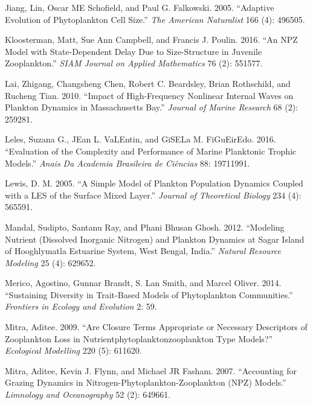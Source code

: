 \documentclass[
  letterpaper,
  DIV=11,
  numbers=noendperiod]{scrartcl}
\newlength{\cslhangindent}
\newlength{\cslentryspacingunit} %
\newenvironment{CSLReferences}[2] %
 {%
  \setlength{\parindent}{0pt}
  \ifodd #1
  \let\oldpar\par
  \def\par{\hangindent=\cslhangindent\oldpar}
  \fi
  \setlength{\parskip}{#2\cslentryspacingunit}
 }%
 {}
\begin{document}
\begin{CSLReferences}{1}{0}
\leavevmode{}%
Jiang, Lin, Oscar ME Schofield, and Paul G. Falkowski. 2005. {``Adaptive
Evolution of Phytoplankton Cell Size.''} \emph{The American Naturalist}
166 (4): 496505.

\leavevmode{}%
Kloosterman, Matt, Sue Ann Campbell, and Francis J. Poulin. 2016. {``An
NPZ Model with State-Dependent Delay Due to Size-Structure in Juvenile
Zooplankton.''} \emph{SIAM Journal on Applied Mathematics} 76 (2):
551577.

\leavevmode{}%
Lai, Zhigang, Changsheng Chen, Robert C. Beardsley, Brian Rothschild,
and Rucheng Tian. 2010. {``Impact of High-Frequency Nonlinear Internal
Waves on Plankton Dynamics in Massachusetts Bay.''} \emph{Journal of
Marine Research} 68 (2): 259281.

\leavevmode{}%
Leles, Suzana G., JEan L. VaLEntin, and GiSELa M. FiGuEirEdo. 2016.
{``Evaluation of the Complexity and Performance of Marine Planktonic
Trophic Models.''} \emph{Anais Da Academia Brasileira de Ciências} 88:
19711991.

\leavevmode{}%
Lewis, D. M. 2005. {``A Simple Model of Plankton Population Dynamics
Coupled with a LES of the Surface Mixed Layer.''} \emph{Journal of
Theoretical Biology} 234 (4): 565591.

\leavevmode{}%
Mandal, Sudipto, Santanu Ray, and Phani Bhusan Ghosh. 2012. {``Modeling
Nutrient (Dissolved Inorganic Nitrogen) and Plankton Dynamics at Sagar
Island of Hooghly{\textendash}matla Estuarine System, West Bengal,
India.''} \emph{Natural Resource Modeling} 25 (4): 629652.

\leavevmode{}%
Merico, Agostino, Gunnar Brandt, S. Lan Smith, and Marcel Oliver. 2014.
{``Sustaining Diversity in Trait-Based Models of Phytoplankton
Communities.''} \emph{Frontiers in Ecology and Evolution} 2: 59.

\leavevmode{}%
Mitra, Aditee. 2009. {``Are Closure Terms Appropriate or Necessary
Descriptors of Zooplankton Loss in
Nutrient{\textendash}phytoplankton{\textendash}zooplankton Type
Models?''} \emph{Ecological Modelling} 220 (5): 611620.

\leavevmode{}%
Mitra, Aditee, Kevin J. Flynn, and Michael JR Fasham. 2007.
{``Accounting for Grazing Dynamics in Nitrogen-Phytoplankton-Zooplankton
(NPZ) Models.''} \emph{Limnology and Oceanography} 52 (2): 649661.


\end{CSLReferences}
\end{document}
